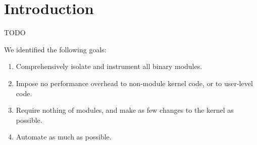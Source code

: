 \documentclass[10pt,preprint]{sigplanconf}
\begin{document}
\begin{abstract}


\end{abstract}


\section{Introduction}\label{sec:intro}

TODO

We identified the following goals:
\begin{enumerate}
	\item Comprehensively isolate and instrument all binary modules.
	\item Impose no performance overhead to non-module kernel code, or to user-level code.
	\item Require nothing of modules, and make as few changes to the kernel as possible.
	\item Automate as much as possible.
\end{enumerate}
\end{document}
